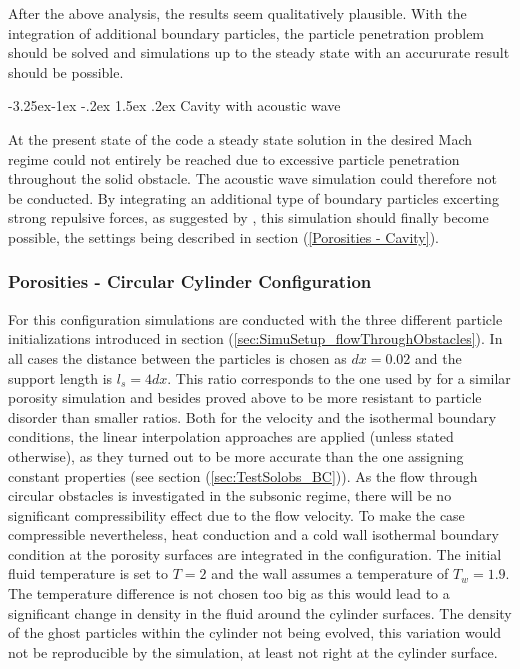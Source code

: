 \documentclass{report}
\makeatletter
\renewcommand\paragraph{\@startsection{paragraph}{4}{\z@}%
  {-3.25ex\@plus -1ex \@minus -.2ex}%
  {1.5ex \@plus .2ex}%
  {\normalfont\normalsize\bfseries}}
\makeatother
\begin{document}
After the above analysis, the results seem qualitatively plausible. With the integration of additional boundary particles, the particle penetration problem should be solved and simulations up to the steady state with an accururate result should be possible. 


\paragraph{Cavity with acoustic wave}

At the present state of the code a steady state solution in the desired Mach regime could not entirely be reached due to excessive particle penetration throughout the solid obstacle. The acoustic wave simulation could therefore not be conducted. By integrating an additional type of boundary particles excerting strong repulsive forces, as suggested by \cite{Liu2003}, this simulation should finally become possible, the settings being described in section (\ref{Porosities - Cavity}). 





\subsubsection{Porosities - Circular Cylinder Configuration}
For this configuration simulations are conducted with the three different particle initializations introduced in section (\ref{sec:SimuSetup_flowThroughObstacles}). In all cases the distance between the particles is chosen as $dx=0.02$ and the support length is $l_s=4dx$. This ratio corresponds to the one used by \cite{Zhu1999} for a similar porosity simulation and besides proved above to be more resistant to particle disorder than smaller ratios. Both for the velocity and the isothermal boundary conditions, the linear interpolation approaches are applied (unless stated otherwise), as they turned out to be more accurate than the one assigning constant properties (see section (\ref{sec:TestSolobs_BC})). As the flow through circular obstacles is investigated in the subsonic regime, there will be no significant compressibility effect due to the flow velocity. To make the case compressible nevertheless, heat conduction and a cold wall isothermal boundary condition at the porosity surfaces are integrated in the configuration. The initial fluid temperature is set to $T=2$ and the wall assumes a temperature of $T_w=1.9$. The temperature difference is not chosen too big as this would lead to a significant change in density in the fluid around the cylinder surfaces. The density of the ghost particles within the cylinder not being evolved, this variation would not be reproducible by the simulation, at least not right at the cylinder surface.
\end{document}
